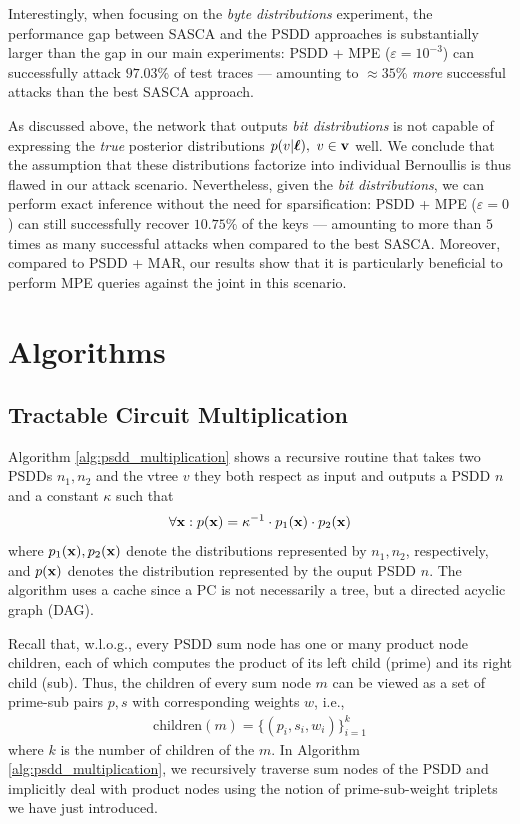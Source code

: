 Interestingly, when focusing on the \emph{byte distributions} experiment, the performance gap between SASCA and the PSDD approaches is substantially larger than the gap in our main experiments: PSDD + MPE ($\varepsilon = 10^{-3}$) can successfully attack $97.03 \%$ of test traces --- amounting to $\approx 35 \%$ \emph{more} successful attacks than the best SASCA approach.

As discussed above, the network that outputs \emph{bit distributions} is not capable of expressing the \emph{true} posterior distributions $p(v | \boldsymbol{\ell}), \ v \in \mathbf{v}$ well. We conclude that the assumption that these distributions factorize into individual Bernoullis is thus flawed in our attack scenario. Nevertheless, given the \emph{bit distributions}, we can perform exact inference without the need for sparsification: PSDD + MPE ($\varepsilon = 0$) can still successfully recover $10.75\%$ of the keys --- amounting to more than $5$ times as many successful attacks when compared to the best SASCA. Moreover, compared to PSDD + MAR, our results show that it is particularly beneficial to perform MPE queries against the joint in this scenario.

\chapter{Algorithms}
\section{Tractable Circuit Multiplication}
\label{app:circuit_mult}
Algorithm \ref{alg:psdd_multiplication} shows a recursive routine that takes two PSDDs $n_1, n_2$ and the vtree $v$ they both respect as input and outputs a PSDD $n$ and a constant $\kappa$ such that
\begin{align}
\forall \mathbf{x}: p(\mathbf{x}) = \kappa^{-1} \cdot p_1(\mathbf{x}) \cdot p_2(\mathbf{x})
\end{align}
where $p_1(\mathbf{x}), p_2(\mathbf{x})$ denote the distributions represented by $n_1, n_2$, respectively, and $p(\mathbf{x})$ denotes the distribution represented by the ouput PSDD $n$.
The algorithm uses a cache since a PC is not necessarily a tree, but a directed acyclic graph (DAG).

Recall that, w.l.o.g., every PSDD sum node has one or many product node children, each of which computes the product of its left child (prime) and its right child (sub). Thus, the children of every sum node $m$ can be viewed as a set of prime-sub pairs $p,s$ with corresponding weights $w$, i.e.,
\begin{align}
\text{children}(m) = \{(p_i, s_i, w_i)\}_{i=1}^k
\end{align}
where $k$ is the number of children of the $m$.
In Algorithm \ref{alg:psdd_multiplication}, we recursively traverse sum nodes of the PSDD and implicitly deal with product nodes using the notion of prime-sub-weight triplets we have just introduced.

